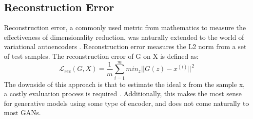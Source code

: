 \begin{comment}
Reconstruction error is primarily used in variational autoencoders. It's the error from feature reduction then reconstruction. 

One problem with it is with a generative network, it's hard to estimate exactly how much the encoding is off by, due to the difficulty of guessing what the GAN output "should" have been. Xiang and Li estimated the error using gradient descent on latent code to find a vector that minimizes the L2 norm between the sample generated from the code and the target sample. This makes the evaluation process time consuming. 

\end{comment}

\subsection{Reconstruction Error}
\label{sub:reconstruction_error}

Reconstruction error, a commonly used metric from mathematics to measure the effectiveness of dimensionality reduction, was naturally extended to the world of variational autoencoders \cite{kingma2013auto}.
Reconstruction error measures the L2 norm from a set of test samples. 
The reconstruction error of G on X is defined as: 
\begin{equation}
    \mathcal{L}_{rec} (G,X) = \frac{1}{m}\sum_{i=1}^{m}min_z||G(z)-x^{(i)}||^2
\end{equation}
The downside of this approach is that to estimate the ideal z from the sample x, a costly evaluation process is required \cite{xiang2017effects}.
Additionally, this makes the most sense for generative models using some type of encoder, and does not come naturally to most GANs.